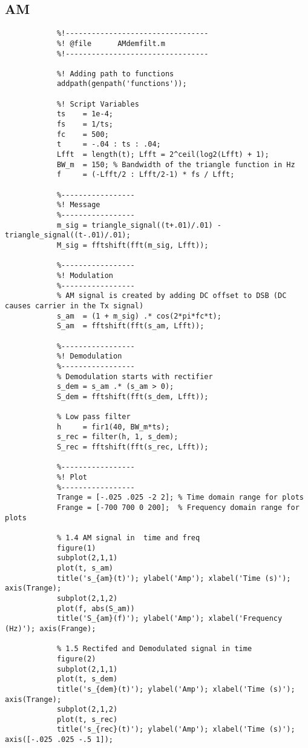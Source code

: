 \documentclass{article}
\begin{document}
    \subsection{AM}
        \begin{verbatim}
            %!---------------------------------
            %! @file      AMdemfilt.m
            %!---------------------------------
            
            %! Adding path to functions
            addpath(genpath('functions'));
            
            %! Script Variables
            ts    = 1e-4;
            fs    = 1/ts;
            fc    = 500;
            t     = -.04 : ts : .04;
            Lfft  = length(t); Lfft = 2^ceil(log2(Lfft) + 1);
            BW_m  = 150; % Bandwidth of the triangle function in Hz
            f     = (-Lfft/2 : Lfft/2-1) * fs / Lfft;
            
            %-----------------
            %! Message
            %-----------------
            m_sig = triangle_signal((t+.01)/.01) - triangle_signal((t-.01)/.01);
            M_sig = fftshift(fft(m_sig, Lfft));
            
            %-----------------
            %! Modulation
            %-----------------
            % AM signal is created by adding DC offset to DSB (DC causes carrier in the Tx signal)
            s_am  = (1 + m_sig) .* cos(2*pi*fc*t);
            S_am  = fftshift(fft(s_am, Lfft));
            
            %-----------------
            %! Demodulation
            %-----------------
            % Demodulation starts with rectifier
            s_dem = s_am .* (s_am > 0);
            S_dem = fftshift(fft(s_dem, Lfft));
            
            % Low pass filter
            h     = fir1(40, BW_m*ts);
            s_rec = filter(h, 1, s_dem);
            S_rec = fftshift(fft(s_rec, Lfft));
            
            %-----------------
            %! Plot
            %-----------------
            Trange = [-.025 .025 -2 2]; % Time domain range for plots
            Frange = [-700 700 0 200];  % Frequency domain range for plots
            
            % 1.4 AM signal in  time and freq
            figure(1)
            subplot(2,1,1)
            plot(t, s_am)
            title('s_{am}(t)'); ylabel('Amp'); xlabel('Time (s)'); axis(Trange);
            subplot(2,1,2)
            plot(f, abs(S_am))
            title('S_{am}(f)'); ylabel('Amp'); xlabel('Frequency (Hz)'); axis(Frange);
            
            % 1.5 Rectifed and Demodulated signal in time
            figure(2)
            subplot(2,1,1)
            plot(t, s_dem)
            title('s_{dem}(t)'); ylabel('Amp'); xlabel('Time (s)'); axis(Trange);
            subplot(2,1,2)
            plot(t, s_rec)
            title('s_{rec}(t)'); ylabel('Amp'); xlabel('Time (s)'); axis([-.025 .025 -.5 1]);
        \end{verbatim}
\end{document}
